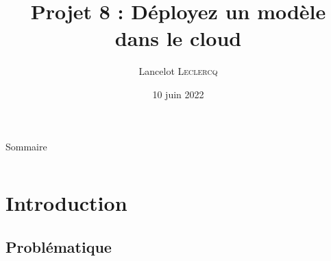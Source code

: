 \documentclass[8pt,aspectratio=169,hyperref={unicode=true}]{beamer}
\title[Déployez un modèle dans le cloud]{Projet 8 : Déployez un modèle dans le cloud}
\author[Lancelot \textsc{Leclercq}]{Lancelot \textsc{Leclercq}}
\institute[]{}
\date[]{\small{10 juin 2022}}
\begin{document}
\begin{frame}[plain]
  \titlepage
\end{frame}

\begin{frame}{Sommaire}
  \Large
  \begin{columns}
    \begin{column}{.7\textwidth}
      \tableofcontents[hideallsubsections]
    \end{column}
  \end{columns}
\end{frame}

\section{Introduction}
\subsection{Problématique}
\end{document}

